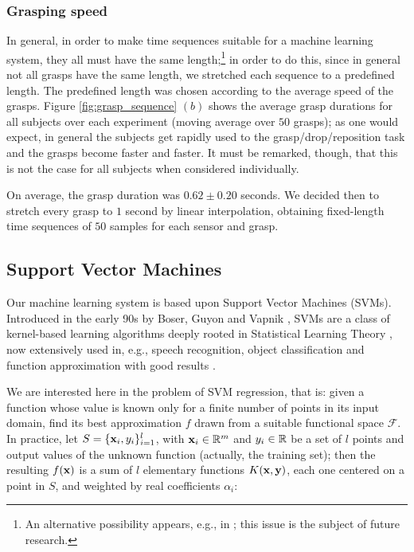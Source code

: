 \subsubsection*{Grasping speed}

In general, in order to make time sequences suitable for a machine
learning system, they all must have the same length;\footnote{An
alternative possibility appears, e.g., in
\cite{shimodaira02dynamic}; this issue is the subject of future
research.} in order to do this, since in general not all grasps have
the same length, we stretched each sequence to a predefined
length. The predefined length was chosen according to the average
speed of the grasps. Figure \ref{fig:grasp_sequence} $(b)$ shows the
average grasp durations for all subjects over each experiment (moving
average over $50$ grasps); as one would expect, in general the
subjects get rapidly used to the grasp/drop/reposition task and the
grasps become faster and faster. It must be remarked, though, that
this is not the case for all subjects when considered individually.

On average, the grasp duration was $0.62 \pm 0.20$ seconds. We decided
then to stretch every grasp to $1$ second by linear interpolation,
obtaining fixed-length time sequences of $50$ samples for each sensor
and grasp.

\subsection{Support Vector Machines}

Our machine learning system is based upon Support Vector Machines
(SVMs). Introduced in the early 90s by Boser, Guyon and Vapnik
\cite{BGV92}, SVMs are a class of kernel-based learning algorithms
deeply rooted in Statistical Learning Theory \cite{v-edbed-82}, now
extensively used in, e.g., speech recognition, object classification
and function approximation with good results \cite{Cristianini00}.

We are interested here in the problem of SVM regression, that is:
given a function whose value is known only for a finite number of
points in its input domain, find its best approximation $f$ drawn from
a suitable functional space $\mathcal{F}$. In practice, let
$S=\{\mathbf{x}_i,y_i\}_{i=1}^l$, with $\mathbf{x}_i \in \mathbb{R}^m$ and $y_i \in \mathbb{R}$ be
a set of $l$ points and output values of the unknown function
(actually, the training set); then the resulting $f(\mathbf{x})$ is a sum of
$l$ elementary functions $K(\mathbf{x},\mathbf{y})$, each one centered on a point in
$S$, and weighted by real coefficients $\alpha_i$:

